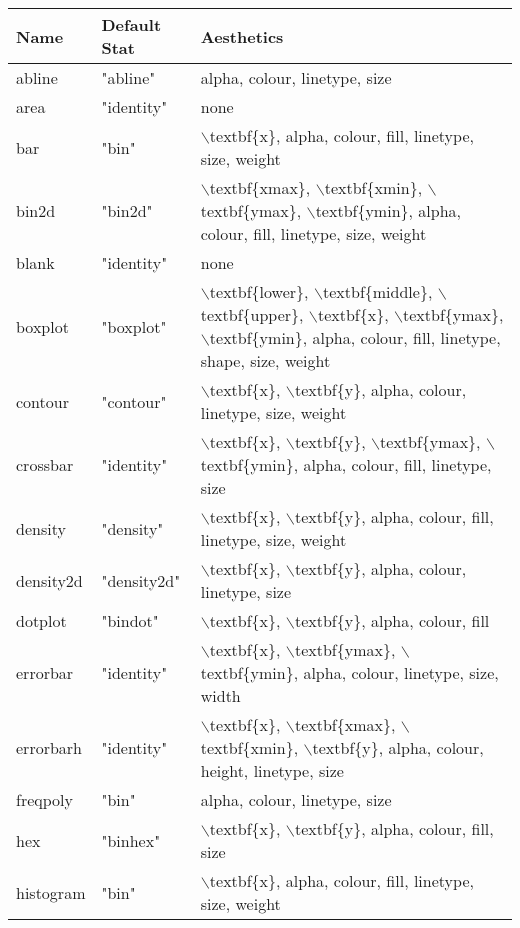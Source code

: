 \begin{table}[ht]
\centering
\begin{tabular}{lll}
  \hline
Name & Default Stat & Aesthetics \\ 
  \hline
abline & "abline" & alpha, colour, linetype, size \\ 
  area & "identity" & none \\ 
  bar & "bin" & $\backslash$textbf\{x\}, alpha, colour, fill, linetype, size, weight \\ 
  bin2d & "bin2d" & $\backslash$textbf\{xmax\}, $\backslash$textbf\{xmin\}, $\backslash$textbf\{ymax\}, $\backslash$textbf\{ymin\}, alpha, colour, fill, linetype, size, weight \\ 
  blank & "identity" & none \\ 
  boxplot & "boxplot" & $\backslash$textbf\{lower\}, $\backslash$textbf\{middle\}, $\backslash$textbf\{upper\}, $\backslash$textbf\{x\}, $\backslash$textbf\{ymax\}, $\backslash$textbf\{ymin\}, alpha, colour, fill, linetype, shape, size, weight \\ 
  contour & "contour" & $\backslash$textbf\{x\}, $\backslash$textbf\{y\}, alpha, colour, linetype, size, weight \\ 
  crossbar & "identity" & $\backslash$textbf\{x\}, $\backslash$textbf\{y\}, $\backslash$textbf\{ymax\}, $\backslash$textbf\{ymin\}, alpha, colour, fill, linetype, size \\ 
  density & "density" & $\backslash$textbf\{x\}, $\backslash$textbf\{y\}, alpha, colour, fill, linetype, size, weight \\ 
  density2d & "density2d" & $\backslash$textbf\{x\}, $\backslash$textbf\{y\}, alpha, colour, linetype, size \\ 
  dotplot & "bindot" & $\backslash$textbf\{x\}, $\backslash$textbf\{y\}, alpha, colour, fill \\ 
  errorbar & "identity" & $\backslash$textbf\{x\}, $\backslash$textbf\{ymax\}, $\backslash$textbf\{ymin\}, alpha, colour, linetype, size, width \\ 
  errorbarh & "identity" & $\backslash$textbf\{x\}, $\backslash$textbf\{xmax\}, $\backslash$textbf\{xmin\}, $\backslash$textbf\{y\}, alpha, colour, height, linetype, size \\ 
  freqpoly & "bin" & alpha, colour, linetype, size \\ 
  hex & "binhex" & $\backslash$textbf\{x\}, $\backslash$textbf\{y\}, alpha, colour, fill, size \\ 
  histogram & "bin" & $\backslash$textbf\{x\}, alpha, colour, fill, linetype, size, weight \\ 

\end{tabular}
\end{table}
